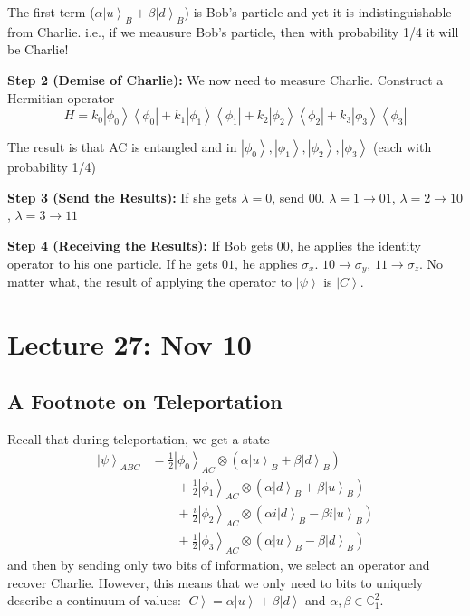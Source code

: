 \documentclass[12pt]{article}
\newcommand{\C}{\mathbb{C}}
\newcommand{\bra}[1]{\left\langle #1 \right\vert }
\newcommand{\ket}[1]{\left\vert #1 \right\rangle}
\begin{document}
            The first term ($\alpha\ket{u}_B + \beta\ket{d}_B$) is Bob's particle and yet it is indistinguishable from Charlie. i.e., if we meausure Bob's particle, then with probability 1/4 it will be Charlie!

            \textbf{Step 2 (Demise of Charlie):} We now need to measure Charlie. Construct a Hermitian operator 
            \[H = k_0 \ket{\phi_0}\bra{\phi_0} +  k_1 \ket{\phi_1}\bra{\phi_1} +  k_2 \ket{\phi_2}\bra{\phi_2} +  k_3 \ket{\phi_3}\bra{\phi_3}\]

            The result is that AC is entangled and in $\ket{\phi_0}, \ket{\phi_1}, \ket{\phi_2}, \ket{\phi_3}$ (each with probability 1/4)

            \textbf{Step 3 (Send the Results):} 
            If she gets $\lambda = 0$, send $00$. $\lambda = 1 \to 01$, $\lambda = 2 \to 10$, $\lambda = 3 \to 11$

            \textbf{Step 4 (Receiving the Results):}
            If Bob gets $00$, he applies the identity operator to his one particle. If he gets $01$, he applies $\sigma_x$. $10 \to \sigma_y$, $11 \to \sigma_z$. No matter what, the result of applying the operator to $\ket{\psi}$ is $\ket{C}$. 

\section*{Lecture 27: Nov 10}
    \subsection*{A Footnote on Teleportation}  
        Recall that during teleportation, we get a state 
        \begin{align*}
            \ket{\psi}_{ABC} &= \frac{1}{2}\ket{\phi_0}_{AC}\otimes (\alpha\ket{u}_B + \beta\ket{d}_B)\\
                &\qquad + \frac{1}{2}\ket{\phi_1}_{AC}\otimes (\alpha\ket{d}_B + \beta\ket{u}_B)\\
                &\qquad + \frac{i}{2}\ket{\phi_2}_{AC}\otimes (\alpha i\ket{d}_B - \beta i\ket{u}_B)\\
                &\qquad + \frac{1}{2}\ket{\phi_3}_{AC} \otimes (\alpha\ket{u}_B - \beta\ket{d}_B)
        \end{align*}
        and then by sending only two bits of information, we select an operator and recover Charlie. However, this means that we only need to bits to uniquely describe a continuum of values: $\ket{C} = \alpha \ket{u} + \beta\ket{d}$ and $\alpha, \beta \in \C_1^2$.
\end{document}

